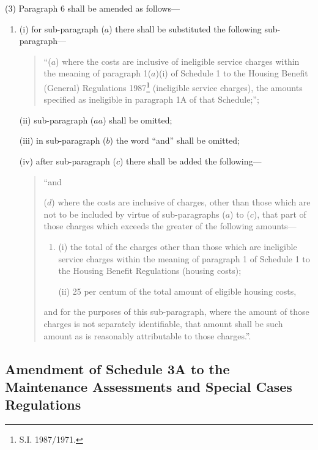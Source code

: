 \documentclass[12pt,a4paper]{article}
\begin{document}
(3) Paragraph 6 shall be amended as follows—
\begin{enumerate}\item[]
(i) for sub-paragraph ($a$) there shall be substituted the following sub-paragraph—
\begin{quotation}
\begin{sloppypar}
“($a$) where the costs are inclusive of ineligible service charges within the meaning of paragraph 1($a$)(i) of Schedule 1 to the Housing Benefit (General) Regulations 1987\footnote{\frenchspacing S.I. 1987/1971.} (ineligible service charges), the amounts specified as ineligible in paragraph 1A of that Schedule;”;
\end{sloppypar}
\end{quotation}

(ii) sub-paragraph ($aa$) shall be omitted;

(iii) in sub-paragraph ($b$) the word “and” shall be omitted;

(iv) after sub-paragraph ($c$) there shall be added the following—
\begin{quotation}
“and

($d$) where the costs are inclusive of charges, other than those which are not to be included by virtue of sub-paragraphs ($a$) to ($c$), that part of those charges which exceeds the greater of the following amounts—
\begin{enumerate}\item[]
(i) the total of the charges other than those which are ineligible service charges within the meaning of paragraph 1 of Schedule 1 to the Housing Benefit Regulations (housing costs);

(ii) 25 per centum of the total amount of eligible housing costs,
\end{enumerate}
and for the purposes of this sub-paragraph, where the amount of those charges is not separately identifiable, that amount shall be such amount as is reasonably attributable to those charges.”.
\end{quotation}

\end{enumerate}

\subsection[48. Amendment of Schedule 3A to the Maintenance Assessments and Special Cases Regulations]{Amendment of Schedule 3A to the Maintenance Assessments and Special Cases Regulations}
\end{document}
